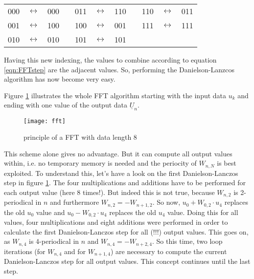 \addvspace{12pt}

\begin{tabular}{ccccccccccc}
000 & $\leftrightarrow$ & 000  & \qquad\qquad &  011 & $\leftrightarrow$ & 110  & \qquad\qquad &  110 & $\leftrightarrow$ & 011 \\
001 & $\leftrightarrow$ & 100  & \qquad\qquad &  100 & $\leftrightarrow$ & 001  & \qquad\qquad &  111 & $\leftrightarrow$ & 111 \\
010 & $\leftrightarrow$ & 010  & \qquad\qquad &  101 & $\leftrightarrow$ & 101 \\
\end{tabular}

\addvspace{12pt}

Having this new indexing, the values to combine according to
equation \ref{eqn:FFTstep} are the adjacent values. So, performing
the Danielson-Lanzcos algorithm has now become very easy.

\addvspace{12pt}

Figure \ref{fig:fft} illustrates the whole FFT algorithm starting with the
input data $u_k$ and ending with one value of the output data
$\underline{U}_n$.

\begin{figure}[htb]
\begin{center}
\texttt{[image: fft]}
\end{center}
\caption{principle of a FFT with data length 8}
\label{fig:fft}
\end{figure}
\FloatBarrier

This scheme alone gives no advantage. But it can compute all output
values within, i.e. no temporary memory is needed and the periocity
of $W_{n,N}$ is best exploited. To understand this, let's have a look
on the first Danielson-Lanczos step in figure \ref{fig:fft}. The four
multiplications and additions have to be performed for each output
value (here 8 times!). But indeed this is not true, because $W_{n,2}$
is 2-periodical in $n$ and furthermore $W_{n,2} = -W_{n+1,2}$. So now,
$u_0 + W_{0,2}\cdot u_4$ replaces the old $u_0$ value and
$u_0 - W_{0,2}\cdot u_4$ replaces the old $u_4$ value. Doing this for
all values, four multiplications and eight additions were performed
in order to calculate the first Danielson-Lanczos step for all (!!!)
output values. This goes on, as $W_{n,4}$ is 4-periodical in $n$ and
$W_{n,4} = -W_{n+2,4}$. So this time, two loop iterations (for $W_{n,4}$
and for $W_{n+1,4}$) are necessary to compute the current
Danielson-Lanczos step for all output values. This concept continues
until the last step.

